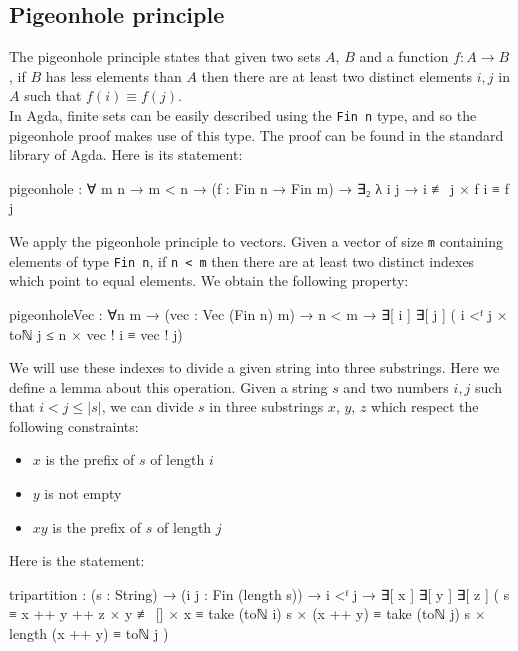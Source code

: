 \subsection{Pigeonhole principle}
The pigeonhole principle states that given two sets $A$, $B$ and a function $f : A \rightarrow B$, if $B$ has less elements than $A$ then there are at least two distinct elements $i,j$ in $A$ such that $f(i) \equiv f(j)$.\\
In Agda, finite sets can be easily described using the \texttt{Fin n} type, and so the pigeonhole proof makes use of this type. The proof can be found in the standard library of Agda. Here is its statement:
\begin{agda}
pigeonhole : ∀ {m n} → m < n → (f : Fin n → Fin m) →
             ∃₂ λ i j → i ≢ j × f i ≡ f j
\end{agda}
We apply the pigeonhole principle to vectors. Given a vector of size \texttt{m} containing elements of type \texttt{Fin n}, if \texttt{n < m} then there are at least two distinct indexes which point to equal elements. We obtain the following property:
\begin{agda}
pigeonholeVec : ∀{n m}
  → (vec : Vec (Fin n) m)
  → n < m
  → ∃[ i ] ∃[ j ] (
          i <ᶠ j 
        × toℕ j ≤ n 
        × vec ! i ≡ vec ! j)
\end{agda}
We will use these indexes to divide a given string into three substrings. Here we define a lemma about this operation. Given a string $s$ and two numbers $i,j$ such that $i < j \leq |s|$, we can divide $s$ in three substrings $x$, $y$, $z$ which respect the following constraints:
\begin{itemize}
    \item $x$ is the prefix of $s$ of length $i$
    \item $y$ is not empty
    \item $xy$ is the prefix of $s$ of length $j$  
\end{itemize}
Here is the statement:
\begin{agda}
tripartition : (s : String)
  → (i j : Fin (length s))
  → i <ᶠ j
  → ∃[ x ] ∃[ y ] ∃[ z ] (
        s ≡ x ++ y ++ z
      × y ≢ []
      × x ≡ take (toℕ i) s
      × (x ++ y) ≡ take (toℕ j) s
      × length (x ++ y) ≡ toℕ j
    )
\end{agda}

